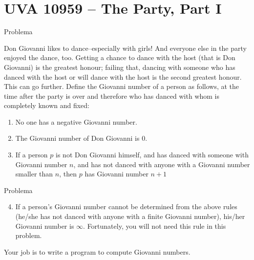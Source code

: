\section{UVA 10959 -- The Party, Part I}

\begin{frame}[fragile]{Problema}

Don Giovanni likes to dance–especially with girls! And everyone else in the party enjoyed the 
dance, too. Getting a chance to dance with the host (that is Don Giovanni) is the greatest honour; 
failing that, dancing with someone who has danced with the host or will dance with the host is the 
second greatest honour. This can go further. Define the Giovanni number of a person as follows, at 
the time after the party is over and therefore who has danced with whom is completely known and 
fixed:

\begin{enumerate}
    \item No one has a negative Giovanni number.
    \item The Giovanni number of Don Giovanni is 0.
    \item If a person $p$ is not Don Giovanni himself, and has danced with someone with Giovanni 
        number $n$, and has not danced with anyone with a Giovanni number smaller than $n$, then 
        $p$ has Giovanni number $n + 1$
\end{enumerate}
\end{frame}

\begin{frame}[fragile]{Problema}
\begin{enumerate}
    \setcounter{enumi}{3}
    \item If a person’s Giovanni number cannot be determined from the above rules (he/she has not 
        danced with anyone with a finite Giovanni number), his/her Giovanni number is 
        $\infty$. Fortunately, you will not need this rule in this problem.
\end{enumerate}

Your job is to write a program to compute Giovanni numbers.

\end{frame}

